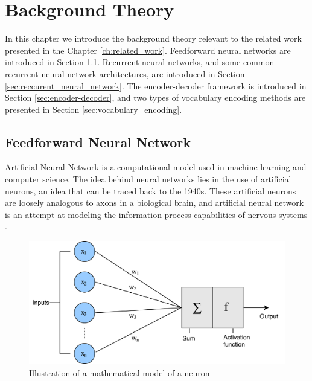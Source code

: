 
\chapter{Background Theory}
\label{ch:background}
In this chapter we introduce the background theory relevant to the related work presented in the Chapter \ref{ch:related_work}. Feedforward neural networks are introduced in Section \ref{sec:feedforward_neural_network}. Recurrent neural networks, and some common recurrent neural network architectures, are introduced in Section \ref{sec:reccurent_neural_network}. The encoder-decoder framework is introduced in Section \ref{sec:encoder-decoder}, and two types of vocabulary encoding methods are presented in Section \ref{sec:vocabulary_encoding}.


\section{Feedforward Neural Network}
\label{sec:feedforward_neural_network}
Artificial Neural Network is a computational model used in machine learning and computer science. The idea behind neural networks lies in the use of artificial neurons, an idea that can be traced back to the 1940s. These artificial neurons are loosely analogous to axons in a biological brain, and artificial neural network is an attempt at modeling the information process capabilities of nervous systems \citep{russell2010aimodernapproach}.

\begin{figure}[ht]
    \centering
    \includegraphics[width=1\textwidth]{fig/related_work/perceptron.png}
    \caption{Illustration of a mathematical model of a neuron}
    \label{fig:nn-perceptron}
\end{figure}


